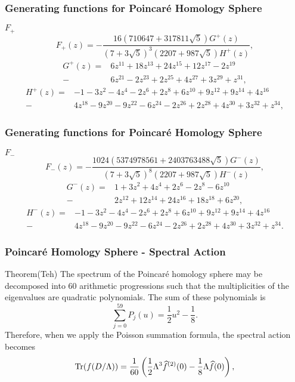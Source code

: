 \documentclass{beamer}
\def\Tr{{\rm Tr}}
\begin{document}
\begin{frame}
	\frametitle{Generating functions for Poincar\'e Homology Sphere}
	\begin{block}{$F_+$}
	\[
F_+(z) = -\frac{16(710647 + 317811 \sqrt{5})G^+(z)}{(7 + 3 \sqrt{5})^3 (2207 + 987 \sqrt{5})H^+(z)},
\]
{\small
$$ \begin{array}{rl}
G^+(z) =&  6z^{11} + 18z^{13} + 24z^{15} + 12z^{17} - 2z^{19} \\[2mm]
- & 6z^{21} - 2z^{23} + 2 z^{25} + 4z^{27} + 3z^{29} + z^{31},
\end{array} $$
$$ \begin{array}{rl}
H^+(z) = & -1 -3 z^{2}  -4z^{4}-2z^{6}+2z^{8}+ 6z^{10} + 9z^{12} + 9z^{14} + 4 z^{16}\\[2mm]
- &  4 z^{18} - 9 z^{20} -9z^{22}-6z^{24}-2z^{26} + 2z^{28} + 4z^{30} + 3z^{32} + z^{34},
\end{array}
$$}
	\end{block}
\end{frame}

\begin{frame}
	\frametitle{Generating functions for Poincar\'e Homology Sphere}
	\begin{block}{$F_-$}
\[
F_-(z) = -\frac{1024(5374978561 + 2403763488  \sqrt{5})G^-(z)}{(7 + 3 \sqrt{5})^8 (2207 + 987 \sqrt{5})H^-(z)},
\]
{\small
$$ \begin{array}{rl}
G^-(z) = & 1 + 3z^{2} + 4z^{4} + 2z^{6} - 2z^{8}-6z^{10} \\[2mm]
- & 2z^{12} + 12 z^{14} + 24z^{16} + 18z^{18} + 6z^{20},
\end{array}
$$
$$ \begin{array}{rl}
H^-(z) = & -1 -3 z^{2}  -4z^{4}-2z^{6}+2z^{8}+ 6z^{10} + 9z^{12} + 9z^{14} + 4 z^{16}
\\[2mm] - & 4 z^{18}  - 9 z^{20} - 9z^{22}-6z^{24}-2z^{26} + 2z^{28} + 4z^{30} + 3z^{32} + z^{34}. \end{array} $$}
	\end{block}
\end{frame}

\begin{frame}
\frametitle{Poincar\'e Homology Sphere - Spectral Action}
\begin{block}{Theorem(Teh)}
The spectrum of the Poincar\'e homology sphere may be decomposed into 60 arithmetic progressions such that the multiplicities of the eigenvalues are quadratic polynomials. The sum of these polynomials is
\[
\sum_{j=0}^{59} P_j(u) =  \frac{1}{2}u^2-\frac{1}{8}. 
\]
Therefore, when we apply the Poisson summation formula, the spectral action becomes
\[
\Tr(f(D/\Lambda)) = \frac{1}{60} \left(  \frac{1}{2}\Lambda^3 \widehat f^{(2)}(0) -\frac{1}{8}\Lambda \widehat f(0)  \right),
\]
\end{block}
\end{frame}
\end{document}
